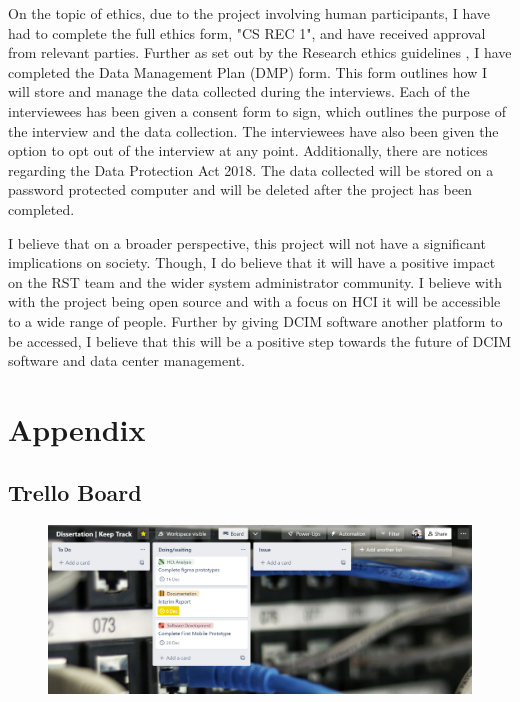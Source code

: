 \documentclass [11pt,a4paper]{article}
\begin{document}
On the topic of ethics, due to the project involving human participants, I have had to complete the full ethics form, "CS REC 1", and have received approval from relevant parties. Further as set out by the Research ethics guidelines \cite{ethicsguidelines}, I have completed the Data Management Plan (DMP) form. This form outlines how I will store and manage the data collected during the interviews. Each of the interviewees has been given a consent form to sign, which outlines the purpose of the interview and the data collection. The interviewees have also been given the option to opt out of the interview at any point. Additionally, there are notices regarding the Data Protection Act 2018. The data collected will be stored on a password protected computer and will be deleted after the project has been completed.

I believe that on a broader perspective, this project will not have a significant implications on society. Though, I do believe that it will have a positive impact on the RST team and the wider system administrator community. I believe with with the project being open source and with a focus on HCI it will be accessible to a wide range of people. Further by giving DCIM software another platform to be accessed, I believe that this will be a positive step towards the future of DCIM software and data center management.

\pagebreak

 

\appendix
\section{Appendix}
\label{sec:appendix}
\subsection{Trello Board}
\label{sec:trello_board}
\begin{figure}[ht]
    \centering
    \includegraphics[width=1\textwidth]{images/trello-board.png}
\end{figure}
\end{document}
